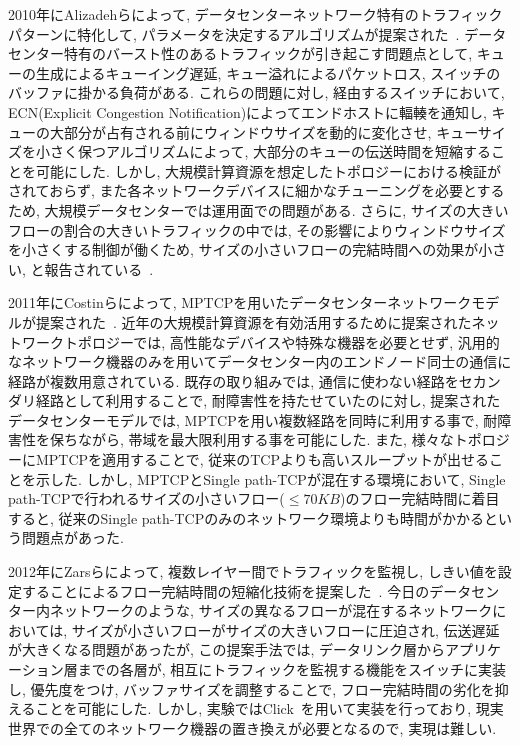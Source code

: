 \documentclass[11pt, a4paper, twocolumn]{jsarticle}
\begin{document}
2010年にAlizadehらによって, データセンターネットワーク特有のトラフィックパターンに特化して,
パラメータを決定するアルゴリズムが提案された~\cite{dctcp}.
データセンター特有のバースト性のあるトラフィックが引き起こす問題点として, キューの生成によるキューイング遅延, キュー溢れによるパケットロス,
スイッチのバッファに掛かる負荷がある.
これらの問題に対し, 経由するスイッチにおいて, ECN(Explicit Congestion Notification)によってエンドホストに輻輳を通知し,
キューの大部分が占有される前にウィンドウサイズを動的に変化させ, キューサイズを小さく保つアルゴリズムによって,
大部分のキューの伝送時間を短縮することを可能にした.
しかし, 大規模計算資源を想定したトポロジーにおける検証がされておらず, また各ネットワークデバイスに細かなチューニングを必要とするため,
大規模データセンターでは運用面での問題がある.
さらに, サイズの大きいフローの割合の大きいトラフィックの中では, その影響によりウィンドウサイズを小さくする制御が働くため,
サイズの小さいフローの完結時間への効果が小さい, と報告されている~\cite{p_fab}.

2011年にCostinらによって, MPTCPを用いたデータセンターネットワークモデルが提案された~\cite{improving}.
近年の大規模計算資源を有効活用するために提案されたネットワークトポロジーでは,
高性能なデバイスや特殊な機器を必要とせず, 汎用的なネットワーク機器のみを用いてデータセンター内のエンドノード同士の通信に経路が複数用意されている.
既存の取り組みでは, 通信に使わない経路をセカンダリ経路として利用することで, 耐障害性を持たせていたのに対し, 提案されたデータセンターモデルでは,
MPTCPを用い複数経路を同時に利用する事で, 耐障害性を保ちながら, 帯域を最大限利用する事を可能にした.
また, 様々なトポロジーにMPTCPを適用することで, 従来のTCPよりも高いスループットが出せることを示した.
しかし, MPTCPとSingle path-TCPが混在する環境において, Single
path-TCPで行われるサイズの小さいフロー($\leq70KB$)のフロー完結時間に着目すると, 従来のSingle
path-TCPのみのネットワーク環境よりも時間がかかるという問題点があった.

2012年にZarsらによって, 複数レイヤー間でトラフィックを監視し,
しきい値を設定することによるフロー完結時間の短縮化技術を提案した~\cite{detail}.
今日のデータセンター内ネットワークのような, サイズの異なるフローが混在するネットワークにおいては, サイズが小さいフローがサイズの大きいフローに圧迫され,
伝送遅延が大きくなる問題があったが, この提案手法では, データリンク層からアプリケーション層までの各層が,
相互にトラフィックを監視する機能をスイッチに実装し, 優先度をつけ, バッファサイズを調整することで, フロー完結時間の劣化を抑えることを可能にした.
しかし, 実験ではClick~\cite{click}を用いて実装を行っており, 現実世界での全てのネットワーク機器の置き換えが必要となるので, 実現は難しい.
\end{document}

